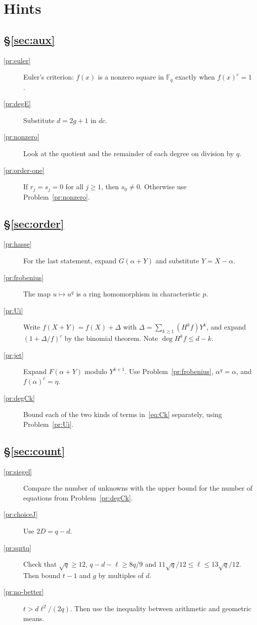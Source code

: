 \documentclass[reqno]{amsart}
\theoremstyle{definition}
\theoremstyle{plain}
\newcommand{\F}{\mathbb{F}}
\begin{document}
\section*{Hints}

\subsection*{\S\ref{sec:aux}}
\begin{description}
\item[\ref{pr:euler}] Euler's criterion: \(f(x)\) is a nonzero square in \(\F_q\) exactly when \(f(x)^c = 1\).
\item[\ref{pr:degE}] Substitute \(d = 2g + 1\) in \(dc\).
\item[\ref{pr:nonzero}] Look at the quotient and the remainder of each degree on division by \(q\).
\item[\ref{pr:order-one}] If \(r_j = s_j = 0\) for all \(j \ge 1\), then \(s_0 \ne 0\).  Otherwise use Problem~\ref{pr:nonzero}.
\end{description}

\subsection*{\S\ref{sec:order}}
\begin{description}
\item[\ref{pr:hasse}] For the last statement, expand \(G(\alpha + Y)\) and substitute \(Y = X - \alpha\).
\item[\ref{pr:frobenius}] The map \(u \mapsto u^q\) is a ring homomorphism in characteristic \(p\).
\item[\ref{pr:Ui}] Write \(f(X + Y) = f(X) + \Delta\) with \(\Delta = \sum_{k \ge 1} (H^k f) Y^k\), and expand \((1 + \Delta/f)^c\) by the binomial theorem.  Note \(\deg H^k f \le d - k\).
\item[\ref{pr:jet}] Expand \(F(\alpha + Y)\) modulo \(Y^{k+1}\).  Use Problem~\ref{pr:frobenius}, \(\alpha^q = \alpha\), and \(f(\alpha)^c = \eta\).
\item[\ref{pr:degCk}] Bound each of the two kinds of terms in~\eqref{eq:Ck} separately, using Problem~\ref{pr:Ui}.
\end{description}

\subsection*{\S\ref{sec:count}}
\begin{description}
\item[\ref{pr:siegel}] Compare the number of unknowns with the upper bound for the number of equations from Problem~\ref{pr:degCk}.
\item[\ref{pr:choiceJ}] Use \(2D = q - d\).
\item[\ref{pr:sqrtq}] Check that \(\sqrt q \ge 12\), \(q - d - \ell \ge 8q/9\) and \(11\sqrt q/12 \le \ell \le 13\sqrt q/12\).  Then bound \(t - 1\) and \(g\) by multiples of \(d\).
\item[\ref{pr:no-better}] \(t > d\ell^2/(2q)\).  Then use the inequality between arithmetic and geometric means.
\end{description}
\end{document}

